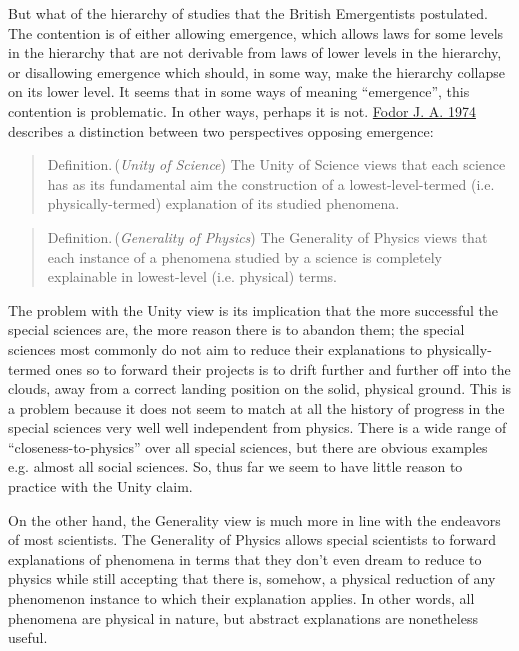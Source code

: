 \documentclass{article}
\newcommand{\ti}[1]{\textit{#1}}
\newcommand{\definition}{{\sc Definition.}\,}
\renewcommand{\cite}[1]{\hyperlink{#1}{#1}}
\begin{document}

But what of the hierarchy of studies that the British Emergentists postulated. The contention is of either allowing emergence, which allows laws for some levels in the hierarchy that are not derivable from laws of lower levels in the hierarchy, or disallowing emergence which should, in some way, make the hierarchy collapse on its lower level. It seems that in some ways of meaning ``emergence'', this contention is problematic. In other ways, perhaps it is not. \cite{Fodor J. A. 1974} describes a distinction between two perspectives opposing emergence:

\begin{quote}
    \definition (\ti{Unity of Science}) The Unity of Science views that each science has as its fundamental aim the construction of a lowest-level-termed (i.e. physically-termed) explanation of its studied phenomena.
\end{quote}

\begin{quote}
    \definition (\ti{Generality of Physics}) The Generality of Physics views that each instance of a phenomena studied by a science is completely explainable in lowest-level (i.e. physical) terms.
\end{quote}

The problem with the Unity view is its implication that the more successful the special sciences are, the more reason there is to abandon them; the special sciences most commonly do not aim to reduce their explanations to physically-termed ones so to forward their projects is to drift further and further off into the clouds, away from a correct landing position on the solid, physical ground. This is a problem because it does not seem to match at all the history of progress in the special sciences very well well independent from physics. There is a wide range of ``closeness-to-physics'' over all special sciences, but there are obvious examples e.g. almost all social sciences. So, thus far we seem to have little reason to practice with the Unity claim.

On the other hand, the Generality view is much more in line with the endeavors of most scientists. The Generality of Physics allows special scientists to forward explanations of phenomena in terms that they don't even dream to reduce to physics while still accepting that there is, somehow, a physical reduction of any phenomenon instance to which their explanation applies. In other words, all phenomena are physical in nature, but abstract explanations are nonetheless useful.
\end{document}
